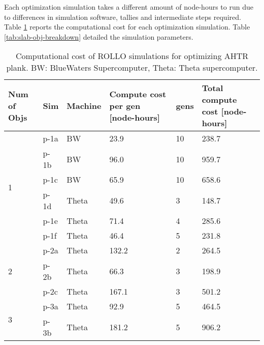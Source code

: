 Each optimization simulation takes a different amount of node-hours to run due to 
differences in simulation software, tallies and intermediate steps required. 
Table \ref{tab:plank-compute-cost} reports the computational cost for each optimization 
simulation. 
Table \ref{tab:slab-obj-breakdown} detailed the simulation parameters.
\begin{table}[htbp!]
    \centering
    \onehalfspacing
    \caption{Computational cost of \acrfull{ROLLO} simulations for optimizing \acrfull{AHTR}
    plank. BW: BlueWaters Supercomputer, Theta: Theta supercomputer.}
	\label{tab:plank-compute-cost}
    \footnotesize
    \begin{tabular}{p{1.4cm}|p{1cm}lp{4cm}lp{4cm}}
    \hline 
    \textbf{Num of Objs} & \textbf{Sim} & \textbf{Machine} & \textbf{Compute cost per gen [node-hours]} &\textbf{gens} & \textbf{Total compute cost [node-hours]} \\
    \hline
    \multirow{6}{2cm}{1} 
    & p-1a & BW & 23.9 & 10 & 238.7 \\
    & p-1b & BW & 96.0 & 10 & 959.7 \\
    & p-1c & BW & 65.9 & 10 & 658.6 \\
    & p-1d & Theta & 49.6 & 3 & 148.7 \\
    & p-1e & Theta & 71.4 & 4 & 285.6 \\
    & p-1f & Theta & 46.4 & 5 & 231.8 \\
    \hline
    \multirow{3}{2cm}{2}
    & p-2a & Theta & 132.2 & 2 & 264.5 \\
    & p-2b & Theta & 66.3 & 3 & 198.9 \\
    & p-2c & Theta & 167.1 & 3 & 501.2 \\
    \hline
    \multirow{2}{2cm}{3}
    & p-3a & Theta & 92.9 & 5 & 464.5 \\
    & p-3b & Theta & 181.2 & 5 & 906.2 \\
    \hline
    \end{tabular}
\end{table}
